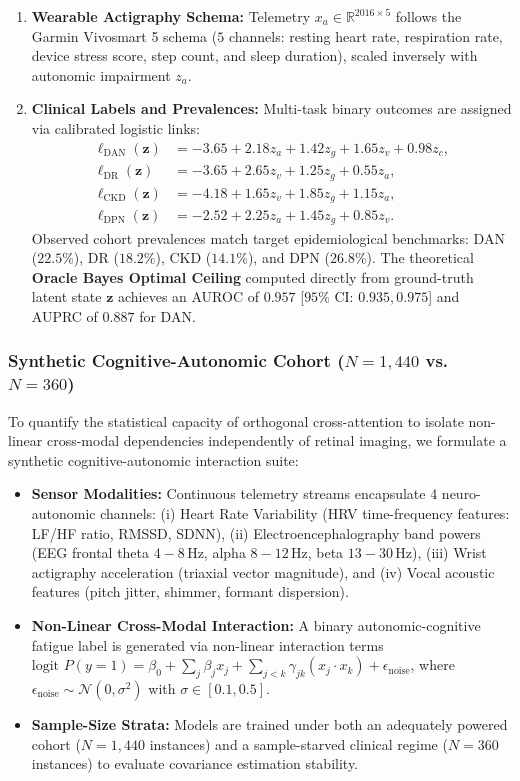 \documentclass[a4paper,fleqn]{cas-dc}
\begin{document}
\begin{enumerate}
    \item \textbf{Wearable Actigraphy Schema:} Telemetry $x_a \in \mathbb{R}^{2016 \times 5}$ follows the Garmin Vivosmart 5 schema ($5$ channels: resting heart rate, respiration rate, device stress score, step count, and sleep duration), scaled inversely with autonomic impairment $z_a$.
    \item \textbf{Clinical Labels and Prevalences:} Multi-task binary outcomes are assigned via calibrated logistic links:
    \begin{align}
        \ell_{\text{DAN}}(\mathbf{z}) &= -3.65 + 2.18 z_a + 1.42 z_g + 1.65 z_v + 0.98 z_c, \\
        \ell_{\text{DR}}(\mathbf{z})  &= -3.65 + 2.65 z_v + 1.25 z_g + 0.55 z_a, \\
        \ell_{\text{CKD}}(\mathbf{z}) &= -4.18 + 1.65 z_v + 1.85 z_g + 1.15 z_a, \\
        \ell_{\text{DPN}}(\mathbf{z}) &= -2.52 + 2.25 z_a + 1.45 z_g + 0.85 z_v.
    \end{align}
    Observed cohort prevalences match target epidemiological benchmarks: DAN ($22.5\%$), DR ($18.2\%$), CKD ($14.1\%$), and DPN ($26.8\%$). The theoretical \textbf{Oracle Bayes Optimal Ceiling} computed directly from ground-truth latent state $\mathbf{z}$ achieves an AUROC of $0.957$ [$95\%$ CI: $0.935, 0.975$] and AUPRC of $0.887$ for DAN.
\end{enumerate}

\subsubsection{Synthetic Cognitive-Autonomic Cohort ($N=1{,}440$ vs. $N=360$)}
To quantify the statistical capacity of orthogonal cross-attention to isolate non-linear cross-modal dependencies independently of retinal imaging, we formulate a synthetic cognitive-autonomic interaction suite:
\begin{itemize}
    \item \textbf{Sensor Modalities:} Continuous telemetry streams encapsulate 4 neuro-autonomic channels: (i) Heart Rate Variability (HRV time-frequency features: LF/HF ratio, RMSSD, SDNN), (ii) Electroencephalography band powers (EEG frontal theta $4-8$\,Hz, alpha $8-12$\,Hz, beta $13-30$\,Hz), (iii) Wrist actigraphy acceleration (triaxial vector magnitude), and (iv) Vocal acoustic features (pitch jitter, shimmer, formant dispersion).
    \item \textbf{Non-Linear Cross-Modal Interaction:} A binary autonomic-cognitive fatigue label is generated via non-linear interaction terms $\text{logit } P(y=1) = \beta_0 + \sum_j \beta_j x_j + \sum_{j < k} \gamma_{jk} (x_j \cdot x_k) + \epsilon_{\text{noise}}$, where $\epsilon_{\text{noise}} \sim \mathcal{N}(0, \sigma^2)$ with $\sigma \in [0.1, 0.5]$.
    \item \textbf{Sample-Size Strata:} Models are trained under both an adequately powered cohort ($N=1{,}440$ instances) and a sample-starved clinical regime ($N=360$ instances) to evaluate covariance estimation stability.
\end{itemize}
\end{document}
